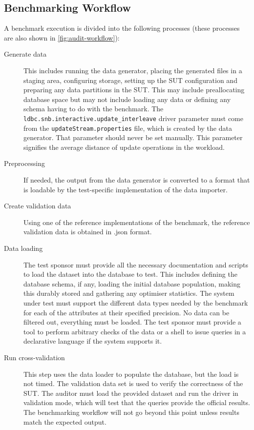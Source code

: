 \subsection{Benchmarking Workflow}
\label{sec:benchmark-workflow}

A benchmark execution is divided into the following processes (these processes are also shown in \autoref{fig:audit-workflow}):

\begin{description}
    \item[Generate data] This includes running the data generator, placing the generated files in a staging area, configuring storage, setting up the SUT configuration and preparing any data partitions in the SUT. This may include preallocating database space but may not include loading any data or defining any schema having to do with the benchmark. The \verb|ldbc.snb.interactive.update_interleave| driver parameter must come from the \verb|updateStream.properties| file, which is created by the data generator. That parameter should never be set manually. This parameter signifies the average distance of update operations in the workload.
    \item[Preprocessing] If needed, the output from the data generator is converted to a format that is loadable by the test-specific implementation of the data importer.
    \item[Create validation data] Using one of the reference implementations of the benchmark, the reference validation data is obtained in .json format.
    \item[Data loading] The test sponsor must provide all the necessary documentation and scripts to load the dataset into the database to test.
    This includes defining the database schema, if any, loading the initial database population, making this durably stored and gathering any optimiser statistics.
    The system under test must support the different data types needed by the benchmark for each of the attributes at their specified precision. No data can be filtered out, everything must be loaded. The test sponsor must provide a tool to perform arbitrary checks of the data or a shell to issue queries in a declarative language if the system supports it.
    \item[Run cross-validation] This step uses the data loader to populate the database, but the load is not timed. The validation data set is used to verify the correctness of the SUT. The auditor must load the provided dataset and run the driver in validation mode, which will test that the queries provide the official results.  The benchmarking workflow will not go beyond this point unless results match the expected output.

\end{description}
